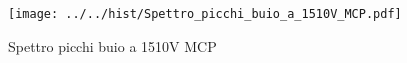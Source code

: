 \begin{figure}[h] \centering \texttt{[image: ../../hist/Spettro\_picchi\_buio\_a\_1510V\_MCP.pdf]}\caption{Spettro picchi buio a 1510V MCP}\label{hist:Spettro_picchi_buio_a_1510V_MCP} \end{figure}
